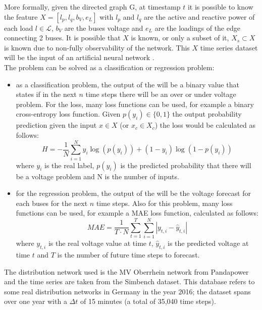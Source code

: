 More formally, given the directed graph \gls{G}, at timestamp $t$ it is possible to know the feature $X=[l_p,l_q,b_V,e_L]$ with $l_p$ and $l_q$ are the active and reactive power of each load $l \in \mathcal{L}$, $b_V$ are the buses voltage and $e_L$ are the loadings of the edge connecting 2 buses. It is possible that $X$ is known, or only a subset of it, $X_s \subset X$ is known due to non-fully observability of the network. This $X$ time series dataset will be the input of an artificial neural network .\\
The problem can be solved as a classification or regression problem: 
\begin{itemize}
    \item as a classification problem, the output of the  will be a binary value that states if in the next $n$ time steps there will be an over or under voltage problem. For the loss, many loss functions can be used, for example a binary cross-entropy loss function. Given $p(y_i) \in \{0,1\}$ the output probability prediction given the input $x \in X$ (or $x_c \in X_c$) the loss would be calculated as follows: 
    \[
    H = - \frac{1}{N} \sum_{i=1}^{N} y_i \log{(p(y_i))} + (1 - y_i) \log{(1 - p(y_i))} 
    \]
    where $y_i$ is the real label, $p(y_i)$ is the predicted probability that there will be a voltage problem and N is the number of inputs.
    \item for the regression problem, the output of the  will be the voltage forecast for each buses for the next $n$ time steps. Also for this problem, many loss functions can be used, for example a \gls{MAE} loss function, calculated as follows:
    \[
    MAE = \frac{1}{T \cdot N} \sum_{t=1}^{T} \sum_{i=1}^{N} |y_{t,i} - \hat{y}_{t,i}|
    \]
    where $y_{t,i}$ is the real voltage value at time $t$, $\hat{y}_{t,i}$ is the predicted voltage at time $t$ and $T$ is the number of future time steps to forecast.
\end{itemize}

The distribution network used is the MV Oberrhein network from Pandapower and the time series are taken from the Simbench dataset. This database refers to some real distribution networks in Germany in the year 2016; the dataset spans over one year with a $\Delta t$ of 15 minutes (a total of 35,040 time steps).

